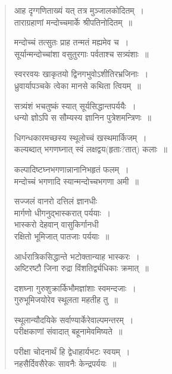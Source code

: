 \documentclass[11pt, openany]{book}
\begin{document}
\newpage
\begin{quote}
{\qt आह दृग्गणिताख्यं यत् तत्र मुञ्जालकोदितम्~।\\
ताराग्रहाणां मन्दोच्चमार्के श्रीपतिनोदितम्~॥

मन्दोच्चं तत्सुतः प्राह तन्मतं मह्यमेव च~।\\
सूर्यान्मन्दोच्चांशा वसुतुरगाः पर्वताश्च सत्र्यंशाः~॥

स्वररवयः खाकृतयो द्विनगभुवोऽशीतिरभ्रजिनाः~।\\
ध्रुवार्यापञ्चके त्वेका मानसे कथिता त्वियम्~॥

सत्र्यंशं भचतुष्कं स्यात् सूर्यसिद्धान्तपर्ययैः~।\\
धन्यो ज्ञोऽपि स सौम्यस्य ज्ञानिन पुत्रेशमन्त्रिणः~॥

धिगन्धकारमच्छस्य स्थूलोच्चं खस्थमार्किजम्~।\\
कल्यब्दात् भगणघ्नात् स्वं लक्षद्वय(हृताः?तात्) कलाः~॥

कल्पादिष्टघ्नभगणान्नानानिभहृतं फलम्~।\\
मन्दोच्चं भगणादि स्यान्मन्दोच्चभगणा अमी~॥

सज्जलं वानरो दत्तिलं ज्ञानधीः\\
मार्गणो धीगनुद्भास्करात् पर्ययाः~।\\
भास्करो देहवान् वासुकिर्गानधी\\
रक्षितो भूमिजात् पातजाः पर्ययाः~॥

आर्धरात्रिकसिद्धान्ते भटोक्तान्याह भास्करः~।\\
अष्टिरष्टौ जिना रुद्रा विंशतिर्द्व्यधिकाः क्रमात्~॥

दशघ्ना गुरुशुक्रार्किभौमज्ञांशाः स्वमन्दजाः~।\\
गुरुभूमिजयोरेव स्थूलता महतीह तु~॥

स्थूलान्यौदयिके सर्वाण्यार्केरेवाल्पमन्तरम्~।\\
परीक्षकाणां संवादात् बहूनामेवमिष्यते~॥

परीक्षा चोदनार्थं हि द्वेधाहार्यभटः स्वयम्~।\\
नहसैर्दिवसैरेकः सावनैः केन्द्रपर्ययः~॥}
\end{quote}
\end{document}
